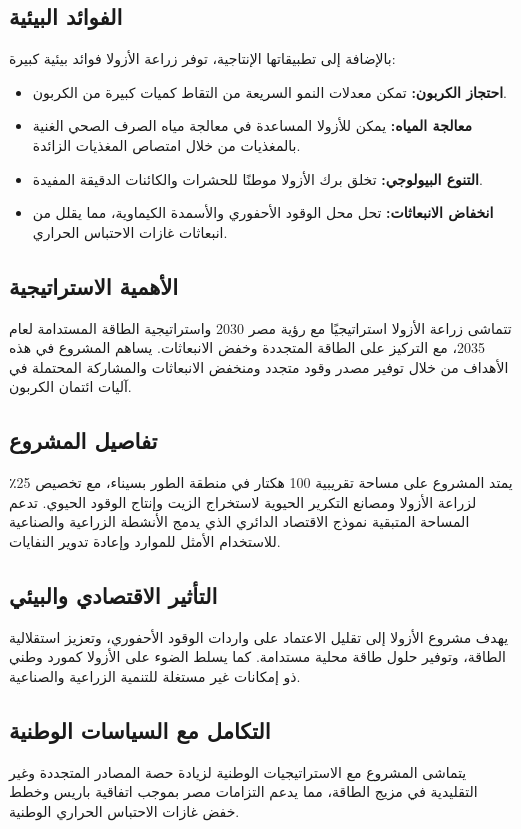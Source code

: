 \subsection{الفوائد البيئية}

بالإضافة إلى تطبيقاتها الإنتاجية، توفر زراعة الأزولا فوائد بيئية كبيرة:

\begin{itemize}
    \item \textbf{احتجاز الكربون:} تمكن معدلات النمو السريعة من التقاط كميات كبيرة من الكربون.
    
    \item \textbf{معالجة المياه:} يمكن للأزولا المساعدة في معالجة مياه الصرف الصحي الغنية بالمغذيات من خلال امتصاص المغذيات الزائدة.
    
    \item \textbf{التنوع البيولوجي:} تخلق برك الأزولا موطنًا للحشرات والكائنات الدقيقة المفيدة.
    
    \item \textbf{انخفاض الانبعاثات:} تحل محل الوقود الأحفوري والأسمدة الكيماوية، مما يقلل من انبعاثات غازات الاحتباس الحراري.
\end{itemize}

\subsection{الأهمية الاستراتيجية}

تتماشى زراعة الأزولا استراتيجيًا مع رؤية مصر 2030 واستراتيجية الطاقة المستدامة لعام 2035، مع التركيز على الطاقة المتجددة وخفض الانبعاثات. يساهم المشروع في هذه الأهداف من خلال توفير مصدر وقود متجدد ومنخفض الانبعاثات والمشاركة المحتملة في آليات ائتمان الكربون.

\subsection{تفاصيل المشروع}

يمتد المشروع على مساحة تقريبية 100 هكتار في منطقة الطور بسيناء، مع تخصيص 25٪ لزراعة الأزولا ومصانع التكرير الحيوية لاستخراج الزيت وإنتاج الوقود الحيوي. تدعم المساحة المتبقية نموذج الاقتصاد الدائري الذي يدمج الأنشطة الزراعية والصناعية للاستخدام الأمثل للموارد وإعادة تدوير النفايات.

\subsection{التأثير الاقتصادي والبيئي}

يهدف مشروع الأزولا إلى تقليل الاعتماد على واردات الوقود الأحفوري، وتعزيز استقلالية الطاقة، وتوفير حلول طاقة محلية مستدامة. كما يسلط الضوء على الأزولا كمورد وطني ذو إمكانات غير مستغلة للتنمية الزراعية والصناعية.

\subsection{التكامل مع السياسات الوطنية}

يتماشى المشروع مع الاستراتيجيات الوطنية لزيادة حصة المصادر المتجددة وغير التقليدية في مزيج الطاقة، مما يدعم التزامات مصر بموجب اتفاقية باريس وخطط خفض غازات الاحتباس الحراري الوطنية.
